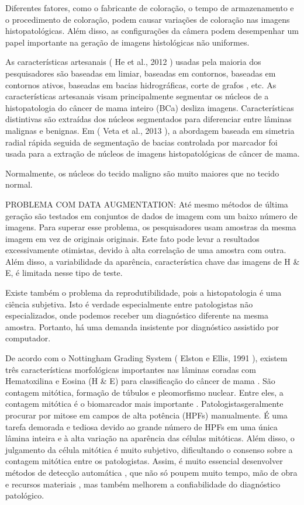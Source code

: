 \documentclass[preprint,12pt,authoryear]{elsarticle}
\begin{document}
Diferentes fatores, como o fabricante de coloração, o tempo de armazenamento e o procedimento de coloração, podem causar variações de coloração nas imagens histopatológicas. Além disso, as configurações da câmera podem desempenhar um papel importante na geração de imagens histológicas não uniformes.


As características artesanais ( He et al., 2012 ) usadas pela maioria dos pesquisadores são baseadas em limiar, baseadas em contornos, baseadas em contornos ativos, baseadas em bacias hidrográficas, corte de grafos , etc. As características artesanais visam principalmente segmentar os núcleos de a histopatologia do câncer de mama inteiro (BCa) desliza imagens. Características distintivas são extraídas dos núcleos segmentados para diferenciar entre lâminas malignas e benignas. Em ( Veta et al., 2013 ), a abordagem baseada em simetria radial rápida seguida de segmentação de bacias controlada por marcador foi usada para a extração de núcleos de imagens histopatológicas de câncer de mama. 

Normalmente, os núcleos do tecido maligno são muito maiores que no tecido normal. \cite{ALQUDAH2019}

PROBLEMA COM DATA AUGMENTATION: Até mesmo métodos de última geração são testados em conjuntos de dados de imagem com um baixo número de imagens. Para superar esse problema, os pesquisadores usam amostras da mesma imagem em vez de originais originais. Este fato pode levar a resultados excessivamente otimistas, devido à alta correlação de uma amostra com outra. Além disso, a variabilidade da aparência, característica chave das imagens de H & E, é limitada nesse tipo de teste.

Existe também o problema da reprodutibilidade, pois a histopatologia é uma ciência subjetiva. Isto é verdade especialmente entre patologistas não especializados, onde podemos receber um diagnóstico diferente na mesma amostra. Portanto, há uma demanda insistente por diagnóstico assistido por computador. \cite{BARDOU2018}


De acordo com o Nottingham Grading System ( Elston e Ellis, 1991 ), existem três características morfológicas importantes nas lâminas coradas com Hematoxilina e Eosina (H & E) para classificação do câncer de mama . São contagem mitótica, formação de túbulos e pleomorfismo nuclear. Entre eles, a contagem mitótica é o biomarcador mais importante . Patologistasgeralmente procurar por mitose em campos de alta potência (HPFs) manualmente. É uma tarefa demorada e tediosa devido ao grande número de HPFs em uma única lâmina inteira e à alta variação na aparência das células mitóticas. Além disso, o julgamento da célula mitótica é muito subjetivo, dificultando o consenso sobre a contagem mitótica entre os patologistas. Assim, é muito essencial desenvolver métodos de detecção automática , que não só poupem muito tempo, mão de obra e recursos materiais , mas também melhorem a confiabilidade do diagnóstico patológico.
\end{document}
